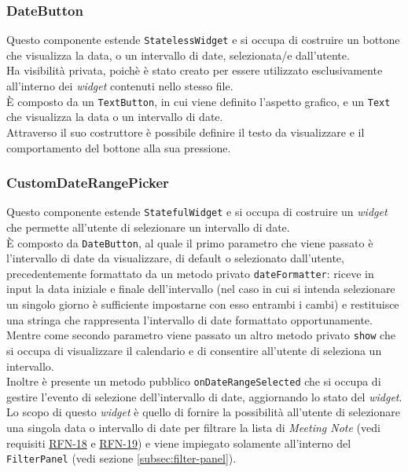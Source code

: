 \subsubsection*{DateButton}
\label{subsubsec:date-button}

Questo componente estende \lstinline{StatelessWidget} e si occupa di costruire un bottone che visualizza la data, o un intervallo di date, selezionata/e dall'utente.\\
Ha visibilità privata, poichè è stato creato per essere utilizzato esclusivamente all'interno dei \emph{widget} contenuti nello stesso file.\\
È composto da un \lstinline{TextButton}\cite{site:text-button}, in cui viene definito l'aspetto grafico, e un \lstinline{Text} che visualizza la data o un intervallo di date. \\
Attraverso il suo costruttore è possibile definire il testo da visualizzare e il comportamento del bottone alla sua pressione.\\

\subsubsection*{CustomDateRangePicker}
\label{subsubsec:custom-date-range-picker}

Questo componente estende \lstinline{StatefulWidget} e si occupa di costruire un \emph{widget} che permette all'utente di selezionare un intervallo di date.\\
È composto da \lstinline{DateButton}, al quale il primo parametro che viene passato è l'intervallo di date da visualizzare, di default o selezionato dall'utente, precedentemente formattato da un metodo privato \lstinline{dateFormatter}: riceve in input la data iniziale e finale dell'intervallo (nel caso in cui si intenda selezionare un singolo giorno è sufficiente impostarne con esso entrambi i cambi) e restituisce una stringa che rappresenta l'intervallo di date formattato opportunamente.\\
Mentre come secondo parametro viene passato un altro metodo privato \lstinline{show} che si occupa di visualizzare il calendario e di consentire all'utente di seleziona un intervallo. \\
Inoltre è presente un metodo pubblico \lstinline{onDateRangeSelected} che si occupa di gestire l'evento di selezione dell'intervallo di date, aggiornando lo stato del \emph{widget}. \\
Lo scopo di questo \emph{widget} è quello di fornire la possibilità all'utente di selezionare una singola data o intervallo di date per filtrare la lista di \emph{Meeting Note} (vedi requisiti \hyperref[RFN-18]{RFN-18} e \hyperref[RFN-19]{RFN-19}) e viene impiegato solamente all'interno del \lstinline{FilterPanel} (vedi sezione \ref{subsec:filter-panel}).

